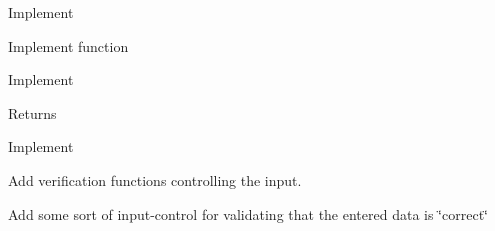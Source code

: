 \begin{DoxyRefList}
Implement  
\item[\label{todo__todo000029}%
\hypertarget{todo__todo000029}{}%
Member \hyperlink{classSamplingThread_a0770f5d1d0c0160cf023fae294010961}{Sampling\+Thread\+:\+:connected} ()]Implement function 

Implement \begin{DoxyReturn}{Returns}

\end{DoxyReturn}

\item[\label{todo__todo000028}%
\hypertarget{todo__todo000028}{}%
Member \hyperlink{classSamplingThread_aa52f1e7171ae5cb8432e949635b02d25}{Sampling\+Thread\+:\+:get\+Data} (\hyperlink{classDataStream}{Data\+Stream} \&)]
\item[\label{todo__todo000022}%
\hypertarget{todo__todo000022}{}%
Member \hyperlink{classSettingsMenu_abc441c12e8044c13f1a99791e2ee30d1}{Settings\+Menu\+:\+:new\+Menu} ()]Implement  
\item[\label{todo__todo000031}%
\hypertarget{todo__todo000031}{}%
Class \hyperlink{classSettingsSingleton}{Settings\+Singleton} ]Add verification functions controlling the input.  
\item[\label{todo__todo000033}%
\hypertarget{todo__todo000033}{}%
Class \hyperlink{classSettingsWidget}{Settings\+Widget} ]Add some sort of input-\/control for validating that the entered data is \char`\"{}correct\char`\"{} 
\end{DoxyRefList}